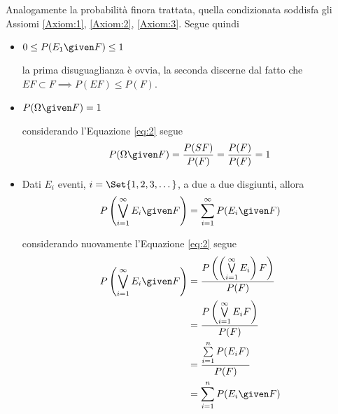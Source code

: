 \documentclass{subfiles}
\begin{document}
Analogamente la probabilità finora trattata, quella condizionata soddisfa gli Assiomi \eqref{Axiom:1}, \eqref{Axiom:2}, \eqref{Axiom:3}. Segue quindi
\begin{itemize}
    \item \(0 \le P(E_{1} \given F) \le 1\)
          \begin{Proof*}
              la prima disuguaglianza è ovvia, la seconda discerne dal fatto che \(EF \subset F \implies P(EF) \le P(F)\).
          \end{Proof*}

    \item \(P(\Omega\given F) = 1\)
          \begin{Proof*}
              considerando l'Equazione \eqref{eq:2} segue
              \[
                  P(\Omega \given F) = \frac{P(SF)}{P(F)} = \frac{P(F)}{P(F)} = 1
              \]
          \end{Proof*}

    \item Dati \(E_{i}\) eventi, \(i = \Set{1, 2, 3, \dots}\), a due a due disgiunti, allora
          \[
              P \left( \bigvee\limits_{i = 1}^{\infty}{E_{i} \given F} \right) = \sum\limits_{i = 1}^{\infty}{P(E_{i} \given F)}
          \]
          \begin{Proof*}
              considerando nuovamente  l'Equazione \eqref{eq:2} segue
              \[\begin{aligned}
                      P \left( \bigvee\limits_{i = 1}^{\infty}{E_{i} \given F} \right) & = \frac{P \left(\left(\bigvee\limits_{i = 1}^{\infty}{E_{i}} \right) F \right)}{P(F)} \\
                                                                                       & = \frac{P \left(\bigvee\limits_{i = 1}^{\infty}{E_{i}F} \right)}{P(F)}                \\
                                                                                       & = \frac{\sum\limits_{i = 1}^{n}{P(E_{i}F)}}{P(F)}                                     \\
                                                                                       & = \sum\limits_{i = 1}^{n}{P(E_{i} \given F)}
                  \end{aligned}\]
          \end{Proof*}
\end{itemize}
\clearpage
\end{document}
